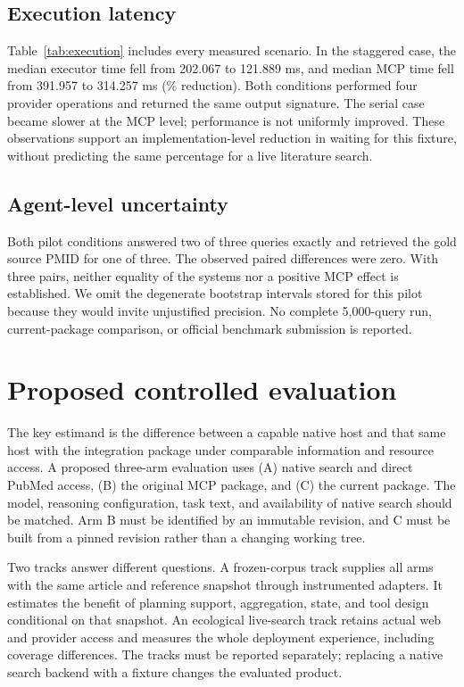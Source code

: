 \documentclass[11pt]{article}
\begin{document}
\subsection{Execution latency}
Table~\ref{tab:execution} includes every measured scenario. In the staggered case,
the median executor time fell from 202.067 to 121.889 ms, and median MCP time fell
from 391.957 to 314.257 ms (\StaggeredReduction\% reduction). Both conditions
performed four provider operations and returned the same output signature. The
serial case became slower at the MCP level; performance is not uniformly improved.
These observations support an implementation-level reduction in waiting for this
fixture, without predicting the same percentage for a live literature search.


\subsection{Agent-level uncertainty}
Both pilot conditions answered two of three queries exactly and retrieved the
gold source PMID for one of three. The observed paired differences were zero.
With three pairs, neither equality of the systems nor a positive MCP effect is
established. We omit the degenerate bootstrap intervals stored for this pilot
because they would invite unjustified precision. No complete 5,000-query run,
current-package comparison, or official benchmark submission is reported.

\section{Proposed controlled evaluation}
The key estimand is the difference between a capable native host and that same
host with the integration package under comparable information and resource
access. A proposed three-arm evaluation uses (A) native search and direct PubMed
access, (B) the original MCP package, and (C) the current package. The model,
reasoning configuration, task text, and availability of native search should be
matched. Arm B must be identified by an immutable revision, and C must be built
from a pinned revision rather than a changing working tree.

Two tracks answer different questions. A frozen-corpus track supplies all arms
with the same article and reference snapshot through instrumented adapters. It
estimates the benefit of planning support, aggregation, state, and tool design
conditional on that snapshot. An ecological live-search track retains actual
web and provider access and measures the whole deployment experience, including
coverage differences. The tracks must be reported separately; replacing a native
search backend with a fixture changes the evaluated product.
\end{document}
